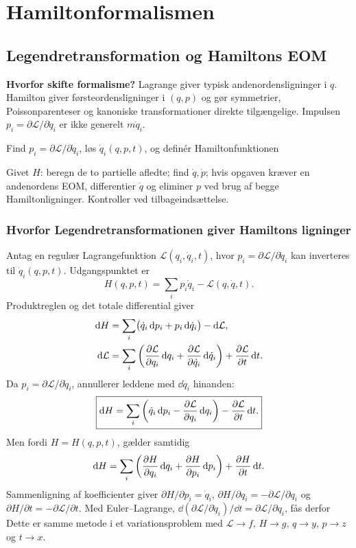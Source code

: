 \clearpage\section{Hamiltonformalismen}
\subsection{Legendretransformation og Hamiltons EOM}
\textbf{Hvorfor skifte formalisme?} Lagrange giver typisk andenordensligninger i $q$. Hamilton giver førsteordensligninger i $(q,p)$ og gør symmetrier, Poissonparenteser og kanoniske transformationer direkte tilgængelige. Impulsen $p_i=\partial\mathcal L/\partial\dot q_i$ er ikke generelt $m\dot q_i$.


Find $p_i=\partial\mathcal L/\partial\dot q_i$, løs $\dot q_i(q,p,t)$, og definér Hamiltonfunktionen
\begin{method}Givet $H$: beregn de to partielle afledte; find $\dot q,\dot p$; hvis opgaven kræver en andenordens EOM, differentier $\dot q$ og eliminer $p$ ved brug af begge Hamiltonligninger. Kontroller ved tilbageindsættelse.\end{method}


\subsubsection*{Hvorfor Legendretransformationen giver Hamiltons ligninger}
Antag en regulær Lagrangefunktion $\mathcal L(q_i,\dot q_i,t)$, hvor $p_i=\partial\mathcal L/\partial\dot q_i$ kan inverteres til $\dot q_i(q,p,t)$. Udgangspunktet er
\[H(q,p,t)=\sum_i p_i\dot q_i-\mathcal L(q,\dot q,t).\]
Produktreglen og det totale differential giver
\begin{align*}
\mathrm d H&=\sum_i\bigl(\dot q_i\,\mathrm d p_i+p_i\,\mathrm d\dot q_i\bigr)-\mathrm d\mathcal L,\\
\mathrm d\mathcal L&=\sum_i\left(\frac{\partial \mathcal L}{\partial q_i}\,\mathrm d q_i+\frac{\partial \mathcal L}{\partial \dot q_i}\,\mathrm d\dot q_i\right)+\frac{\partial \mathcal L}{\partial t}\,\mathrm d t.
\end{align*}
Da $p_i=\partial\mathcal L/\partial\dot q_i$, annullerer leddene med $\dd\dot q_i$ hinanden:
\[\boxed{\mathrm d H=\sum_i\left(\dot q_i\,\mathrm d p_i-\frac{\partial \mathcal L}{\partial q_i}\,\mathrm d q_i\right)-\frac{\partial \mathcal L}{\partial t}\,\mathrm d t.}\]
Men fordi $H=H(q,p,t)$, gælder samtidig
\[\mathrm d H=\sum_i\left(\frac{\partial H}{\partial q_i}\,\mathrm d q_i+\frac{\partial H}{\partial p_i}\,\mathrm d p_i\right)+\frac{\partial H}{\partial t}\,\mathrm d t.\]
Sammenligning af koefficienter giver $\partial H/\partial p_i=\dot q_i$, $\partial H/\partial q_i=-\partial\mathcal L/\partial q_i$ og $\partial H/\partial t=-\partial\mathcal L/\partial t$. Med Euler--Lagrange,
$\dd(\partial\mathcal L/\partial\dot q_i)/\dd t=\partial\mathcal L/\partial q_i$, fås derfor
Dette er samme metode i et variationsproblem med $\mathcal L\to f$, $H\to g$, $q\to y$, $p\to z$ og $t\to x$.


